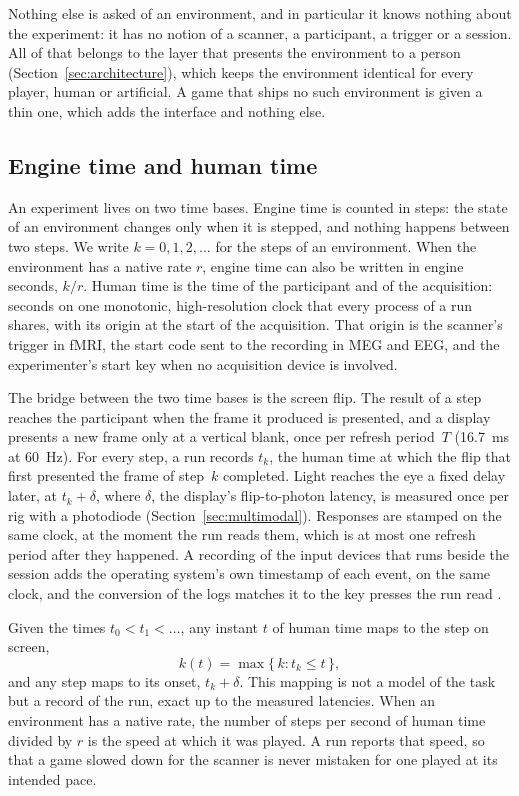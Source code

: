 Nothing else is asked of an environment, and in particular it knows nothing about the experiment: it has no notion of a scanner, a participant, a trigger or a session.
All of that belongs to the layer that presents the environment to a person (Section~\ref{sec:architecture}), which keeps the environment identical for every player, human or artificial.
A game that ships no such environment is given a thin one, which adds the interface and nothing else.

\subsection{Engine time and human time}
\label{sec:time}

An experiment lives on two time bases.
Engine time is counted in steps: the state of an environment changes only when it is stepped, and nothing happens between two steps.
We write $k = 0, 1, 2, \dots$ for the steps of an environment.
When the environment has a native rate $r$, engine time can also be written in engine seconds, $k / r$.
Human time is the time of the participant and of the acquisition: seconds on one monotonic, high-resolution clock that every process of a run shares, with its origin at the start of the acquisition.
That origin is the scanner's trigger in fMRI, the start code sent to the recording in MEG and EEG, and the experimenter's start key when no acquisition device is involved.

The bridge between the two time bases is the screen flip.
The result of a step reaches the participant when the frame it produced is presented, and a display presents a new frame only at a vertical blank, once per refresh period~$T$ (16.7~ms at 60~Hz).
For every step, a run records $t_k$, the human time at which the flip that first presented the frame of step~$k$ completed.
Light reaches the eye a fixed delay later, at $t_k + \delta$, where $\delta$, the display's flip-to-photon latency, is measured once per rig with a photodiode (Section~\ref{sec:multimodal}).
Responses are stamped on the same clock, at the moment the run reads them, which is at most one refresh period after they happened.
A recording of the input devices that runs beside the session adds the operating system's own timestamp of each event, on the same clock, and the conversion of the logs matches it to the key presses the run read .

Given the times $t_0 < t_1 < \dots$, any instant $t$ of human time maps to the step on screen,
\begin{equation}
  k(t) = \max\{\, k : t_k \le t \,\},
  \label{eq:step-on-screen}
\end{equation}
and any step maps to its onset, $t_k + \delta$.
This mapping is not a model of the task but a record of the run, exact up to the measured latencies.
When an environment has a native rate, the number of steps per second of human time divided by $r$ is the speed at which it was played.
A run reports that speed, so that a game slowed down for the scanner is never mistaken for one played at its intended pace.

